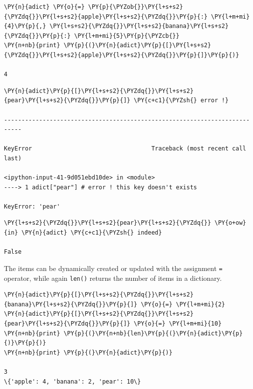 \begin{codebox}
\begin{Verbatim}[commandchars=\\\{\}]
\PY{n}{adict} \PY{o}{=} \PY{p}{\PYZob{}}\PY{l+s+s2}{\PYZdq{}}\PY{l+s+s2}{apple}\PY{l+s+s2}{\PYZdq{}}\PY{p}{:} \PY{l+m+mi}{4}\PY{p}{,} \PY{l+s+s2}{\PYZdq{}}\PY{l+s+s2}{banana}\PY{l+s+s2}{\PYZdq{}}\PY{p}{:} \PY{l+m+mi}{5}\PY{p}{\PYZcb{}}
\PY{n+nb}{print} \PY{p}{(}\PY{n}{adict}\PY{p}{[}\PY{l+s+s2}{\PYZdq{}}\PY{l+s+s2}{apple}\PY{l+s+s2}{\PYZdq{}}\PY{p}{]}\PY{p}{)}

4
\end{Verbatim}
\end{codebox}

\begin{codebox}
\begin{Verbatim}[commandchars=\\\{\}]
\PY{n}{adict}\PY{p}{[}\PY{l+s+s2}{\PYZdq{}}\PY{l+s+s2}{pear}\PY{l+s+s2}{\PYZdq{}}\PY{p}{]} \PY{c+c1}{\PYZsh{} error !}

---------------------------------------------------------------------------

KeyError                                  Traceback (most recent call last)

<ipython-input-41-9d051ebd10de> in <module>
----> 1 adict["pear"] # error ! this key doesn't exists
    
KeyError: 'pear'
\end{Verbatim}
\end{codebox}

\begin{codebox}
\begin{Verbatim}[commandchars=\\\{\}]
\PY{l+s+s2}{\PYZdq{}}\PY{l+s+s2}{pear}\PY{l+s+s2}{\PYZdq{}} \PY{o+ow}{in} \PY{n}{adict} \PY{c+c1}{\PYZsh{} indeed}

False
\end{Verbatim}
\end{codebox}

The items can be dynamically created or updated with the assignment \texttt{=} operator, while 
again \texttt{len()} returns the number of items in a dictionary.

\begin{codebox}
\begin{Verbatim}[commandchars=\\\{\}]
\PY{n}{adict}\PY{p}{[}\PY{l+s+s2}{\PYZdq{}}\PY{l+s+s2}{banana}\PY{l+s+s2}{\PYZdq{}}\PY{p}{]} \PY{o}{=} \PY{l+m+mi}{2}
\PY{n}{adict}\PY{p}{[}\PY{l+s+s2}{\PYZdq{}}\PY{l+s+s2}{pear}\PY{l+s+s2}{\PYZdq{}}\PY{p}{]} \PY{o}{=} \PY{l+m+mi}{10}
\PY{n+nb}{print} \PY{p}{(}\PY{n+nb}{len}\PY{p}{(}\PY{n}{adict}\PY{p}{)}\PY{p}{)}
\PY{n+nb}{print} \PY{p}{(}\PY{n}{adict}\PY{p}{)}

3
\{'apple': 4, 'banana': 2, 'pear': 10\}
\end{Verbatim}
\end{codebox}

